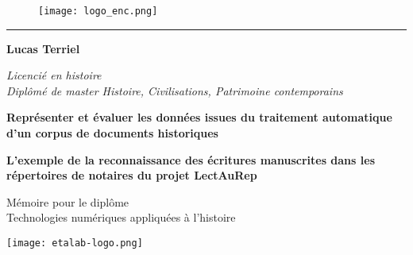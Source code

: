 \begin{titlepage}
    \begin{center}
    
\begin{figure}[h]
    \centering
    \centerline{\texttt{[image: logo\_enc.png]}}
\end{figure}

        \bigskip
    
    
        \begin{center}
            \rule{4cm}{0.02cm}
        \end{center}
    
        \hugeskip
        
        \begin{Large}
             \textbf{Lucas Terriel}\\
        \end{Large}
        \begin{normalsize}
            \textit{Licencié en histoire}\\
            \textit{Diplômé de master 
            Histoire, Civilisations, Patrimoine contemporains}\\
        \end{normalsize}
        
        \hugeskip
        \bigskip
        
        \begin{LARGE}
            \textbf{Représenter et évaluer les données issues du traitement automatique d'un corpus de documents historiques}
            
        \end{LARGE}
        \bigskip
        \bigskip
        \bigskip
        \bigskip
        \begin{large}
            \textbf{L'exemple de la reconnaissance des écritures manuscrites dans les répertoires de notaires du projet LectAuRep}\\
        \end{large}
        
        \hugeskip
        \vfill
        
        
        
        \begin{large}
            Mémoire pour le diplôme\\
            \og Technologies numériques appliquées à l'histoire \fg\\
        \end{large}
        
        \bigskip
        \bigskip
        
        \texttt{[image: etalab-logo.png]}

    \end{center}
\end{titlepage}

\thispagestyle{empty}
\cleardoublepage